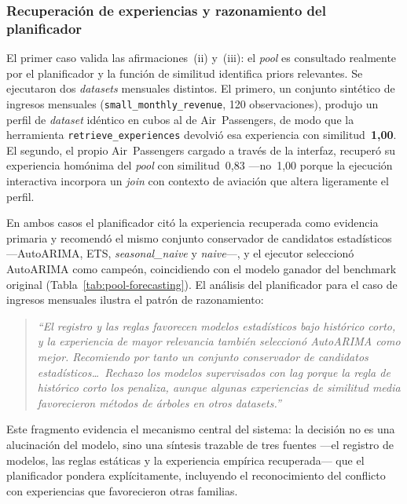 
\subsubsection{Recuperación de experiencias y razonamiento del planificador}
\label{sec:caso-retrieval}

El primer caso valida las afirmaciones~(ii) y~(iii): el \textit{pool} es consultado
realmente por el planificador y la función de similitud identifica priors relevantes.
Se ejecutaron dos \textit{datasets} mensuales distintos. El primero, un conjunto
sintético de ingresos mensuales (\texttt{small\_monthly\_revenue}, 120 observaciones),
produjo un perfil de \textit{dataset} idéntico en cubos al de Air~Passengers, de modo
que la herramienta \texttt{retrieve\_experiences} devolvió esa experiencia con
similitud~\textbf{1,00}. El segundo, el propio Air~Passengers cargado a través de la
interfaz, recuperó su experiencia homónima del \textit{pool} con similitud~0,83 —no~1,00
porque la ejecución interactiva incorpora un \textit{join} con contexto de aviación que
altera ligeramente el perfil.

En ambos casos el planificador citó la experiencia recuperada como evidencia primaria y
recomendó el mismo conjunto conservador de candidatos estadísticos —AutoARIMA, ETS,
\textit{seasonal\_naive} y \textit{naive}—, y el ejecutor seleccionó AutoARIMA como
campeón, coincidiendo con el modelo ganador del benchmark original
(Tabla~\ref{tab:pool-forecasting}). El análisis del planificador para el caso de
ingresos mensuales ilustra el patrón de razonamiento:

\begin{quote}\small\itshape
``El registro y las reglas favorecen modelos estadísticos bajo histórico corto, y la
experiencia de mayor relevancia también seleccionó AutoARIMA como mejor. Recomiendo por
tanto un conjunto conservador de candidatos estadísticos\ldots\ Rechazo los modelos
supervisados con \textit{lag} porque la regla de histórico corto los penaliza, aunque
algunas experiencias de similitud media favorecieron métodos de árboles en otros
\textit{datasets}.''
\end{quote}

Este fragmento evidencia el mecanismo central del sistema: la decisión no es una
alucinación del modelo, sino una síntesis trazable de tres fuentes —el registro de
modelos, las reglas estáticas y la experiencia empírica recuperada— que el planificador
pondera explícitamente, incluyendo el reconocimiento del conflicto con experiencias que
favorecieron otras familias.

